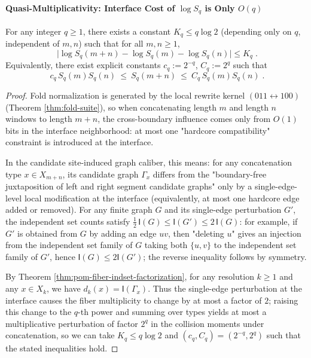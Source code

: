 \paragraph{Quasi-Multiplicativity: Interface Cost of \texorpdfstring{$\log S_q$}{log Sq} is Only \texorpdfstring{$O(q)$}{O(q)}}
\begin{proposition}\label{prop:pom-sq-quasi-multiplicative}
For any integer \(q\ge 1\), there exists a constant \(K_q\le q\log 2\) (depending only on \(q\), independent of \(m,n\)) such that for all \(m,n\ge 1\),
\[
\boxed{\;
\bigl|\log S_q(m+n)-\log S_q(m)-\log S_q(n)\bigr|\le K_q\; }.
\]
Equivalently, there exist explicit constants \(c_q:=2^{-q}\), \(C_q:=2^{q}\) such that
\[
\boxed{\;
c_q\,S_q(m)S_q(n)\ \le\ S_q(m+n)\ \le\ C_q\,S_q(m)S_q(n)\; }.
\]
\end{proposition}
\begin{proof}
Fold normalization is generated by the local rewrite kernel \((011\leftrightarrow 100)\) (Theorem \ref{thm:fold-suite}), so when concatenating length \(m\) and length \(n\) windows to length \(m+n\), the cross-boundary influence comes only from \(O(1)\) bits in the interface neighborhood: at most one "hardcore compatibility" constraint is introduced at the interface.
\par
In the candidate site-induced graph caliber, this means: for any concatenation type \(x\in X_{m+n}\), its candidate graph \(\Gamma_x\) differs from the "boundary-free juxtaposition of left and right segment candidate graphs" only by a single-edge-level local modification at the interface (equivalently, at most one hardcore edge added or removed).
For any finite graph \(G\) and its single-edge perturbation \(G'\), the independent set counts satisfy
\(
\tfrac12\,\mathsf{I}(G)\le \mathsf{I}(G')\le 2\,\mathsf{I}(G)
\):
for example, if \(G'\) is obtained from \(G\) by adding an edge \(uv\), then "deleting \(u\)" gives an injection from the independent set family of \(G\) taking both \(\{u,v\}\) to the independent set family of \(G'\), hence \(\mathsf{I}(G)\le 2\mathsf{I}(G')\); the reverse inequality follows by symmetry.
\par
By Theorem \ref{thm:pom-fiber-indset-factorization}, for any resolution \(k\ge 1\) and any \(x\in X_k\), we have \(d_k(x)=\mathsf{I}(\Gamma_x)\).
Thus the single-edge perturbation at the interface causes the fiber multiplicity to change by at most a factor of \(2\);
raising this change to the \(q\)-th power and summing over types yields at most a multiplicative perturbation of factor \(2^q\) in the collision moments under concatenation,
so we can take \(K_q\le q\log 2\) and \((c_q,C_q)=(2^{-q},2^q)\) such that the stated inequalities hold.
\end{proof}

